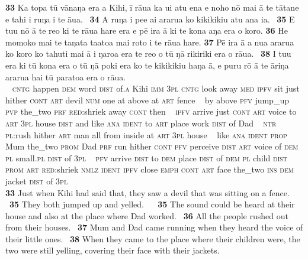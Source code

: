 \bigskip\gll
\textbf{\textup{33}} Ka topa tū vānaŋa era {\ꞌ}a Kihi, {\ꞌ}ī rāua ka u{\ꞌ}i atu ena e noho nō mai {\ꞌ}ā te tātane e tahi {\ꞌ}i ruŋa i te {\ꞌ}āua. ~\textbf{\textup{34}} A ruŋa i pe{\ꞌ}e ai ararua ko kikikikiu atu {\ꞌ}ana ia. ~\textbf{\textup{35}} E tu{\ꞌ}u nō {\ꞌ}ā te re{\ꞌ}o ki te rāua hare era {\ꞌ}e pē ira {\ꞌ}ā ki te kona aŋa era o koro. \textbf{\textup{36}} He momoko mai te taŋata ta{\ꞌ}ato{\ꞌ}a mai roto i te rāua hare. \textbf{\textup{37}} Pē ira {\ꞌ}ā a nua ararua ko koro ko tahuti mai {\ꞌ}ā i ŋaro{\ꞌ}a era te re{\ꞌ}o o tū ŋā rikiriki era o rāua. ~\textbf{\textup{38}} I tu{\ꞌ}u era ki tū kona era o tū ŋā poki era ko te kikikikiu haŋa {\ꞌ}ā, e puru rō {\ꞌ}ā te {\ꞌ}āriŋa ararua hai tū paratoa era o rāua.\\
~ \textsc{cntg} happen \textsc{dem} word \textsc{dist} of\textsc{.a} Kihi \textsc{imm} \textsc{3pl} \textsc{cntg} look away \textsc{med} \textsc{ipfv} sit just hither \textsc{cont} \textsc{art} devil \textsc{num} one at above at \textsc{art} fence ~ by above \textsc{pfv} jump\_up \textsc{pvp} the\_two \textsc{prf} \textsc{red}:shriek away \textsc{cont} then ~ \textsc{ipfv} arrive just \textsc{cont} \textsc{art} voice to \textsc{art} \textsc{3pl} house \textsc{dist} and like \textsc{ana} \textsc{ident} to \textsc{art} place work \textsc{dist} of Dad  ~ \textsc{ntr} \textsc{pl}:rush hither \textsc{art} man all from inside at \textsc{art} \textsc{3pl} house  ~ like \textsc{ana} \textsc{ident} \textsc{prop} Mum the\_two \textsc{prom} Dad \textsc{prf} run hither \textsc{cont} \textsc{pfv} perceive \textsc{dist} \textsc{art} voice of \textsc{dem} \textsc{pl} small.\textsc{pl} \textsc{dist} of \textsc{3pl} ~ \textsc{pfv} arrive \textsc{dist} to \textsc{dem} place \textsc{dist} of \textsc{dem} \textsc{pl} child \textsc{dist} \textsc{prom} \textsc{art} \textsc{red}:shriek \textsc{nmlz} \textsc{ident} \textsc{ipfv} close \textsc{emph} \textsc{cont} \textsc{art} face the\_two \textsc{ins} \textsc{dem} jacket \textsc{dist} of \textsc{3pl}\\

\medskip\glt
\textbf{\textup{33}} Just when Kihi had said that, they saw a devil that was sitting on a fence. ~\textbf{\textup{35}} They both jumped up and yelled. ~ ~\textbf{\textup{35}} The sound could be heard at their house and also at the place where Dad worked. ~\textbf{\textup{36}} All the people rushed out from their houses. ~\textbf{\textup{37}} Mum and Dad came running when they heard the voice of their little ones. ~\textbf{\textup{38}} When they came to the place where their children were, the two were still yelling, covering their face with their jackets. 


